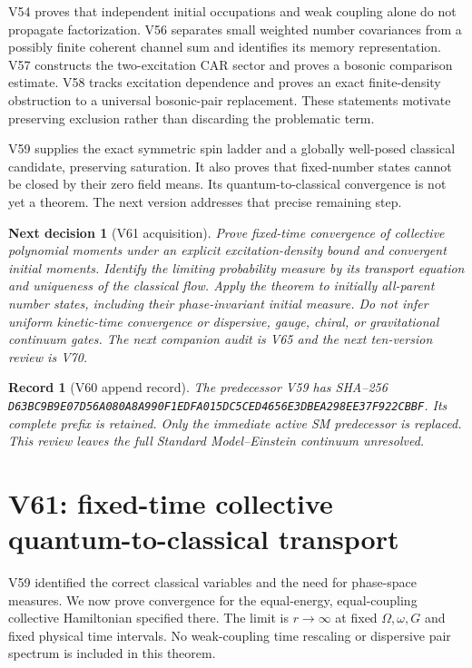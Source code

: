 \documentclass[11pt]{article}
\newtheorem{decision}[theorem]{Next decision}
\newtheorem{record}[theorem]{Record}
\theoremstyle{remark}
\begin{document}
V54 proves that independent initial occupations and weak
coupling alone do not propagate factorization.
V56 separates small weighted number covariances from a
possibly finite coherent channel sum and identifies its
memory representation.  V57 constructs the two-excitation
CAR sector and proves a bosonic comparison estimate.
V58 tracks excitation dependence and proves an exact
finite-density obstruction to a universal bosonic-pair
replacement.  These statements motivate preserving
exclusion rather than discarding the problematic term.

V59 supplies the exact symmetric spin ladder and a
globally well-posed classical candidate, preserving
saturation.  It also proves that fixed-number states
cannot be closed by their zero field means.  Its
quantum-to-classical convergence is not yet a theorem.
The next version addresses that precise remaining step.

\begin{decision}[V61 acquisition]
\label{dec:v20v60-next}
Prove fixed-time convergence of collective polynomial
moments under an explicit excitation-density bound
and convergent initial moments.  Identify the limiting
probability measure by its transport equation and
uniqueness of the classical flow.  Apply the theorem
to initially all-parent number states, including
their phase-invariant initial measure.  Do not infer
uniform kinetic-time convergence or dispersive,
gauge, chiral, or gravitational continuum gates.
The next companion audit is V65 and the next
ten-version review is V70.
\end{decision}

\begin{record}[V60 append record]
\label{rec:v20v60}
The predecessor V59 has SHA--256
\texttt{D63BC9B9E07D56A080A8A990F1EDFA015DC5CED4656E3DBEA298EE37F922CBBF}.
Its complete prefix is retained.  Only the immediate
active SM predecessor is replaced.  This review leaves
the full Standard Model--Einstein continuum unresolved.
\end{record}


\section{V61: fixed-time collective quantum-to-classical transport}
\label{sec:v20v61}

V59 identified the correct classical variables and the need
for phase-space measures.  We now prove convergence for
the equal-energy, equal-coupling collective Hamiltonian
specified there.  The limit is \(r\to\infty\) at fixed
\(\Omega,\omega,G\) and fixed physical time intervals.
No weak-coupling time rescaling or dispersive pair spectrum
is included in this theorem.
\end{document}
